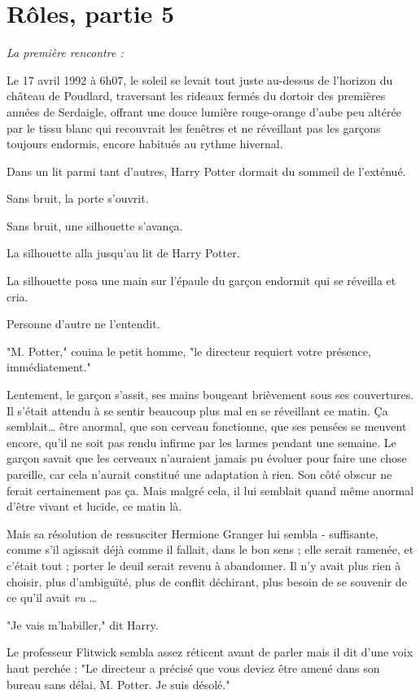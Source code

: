 
\chapter{Rôles, partie 5}

\emph{La première rencontre :} 

Le 17 avril 1992 à 6h07, le soleil se levait tout juste au-dessus de l'horizon du château de Poudlard, traversant les rideaux fermés du dortoir des premières années de Serdaigle, offrant une douce lumière rouge-orange d'aube peu altérée par le tissu blanc qui recouvrait les fenêtres et ne réveillant pas les garçons toujours endormis, encore habitués au rythme hivernal.

Dans un lit parmi tant d'autres, Harry Potter dormait du sommeil de l'exténué.

Sans bruit, la porte s'ouvrit.

Sans bruit, une silhouette s'avança.

La silhouette alla jusqu'au lit de Harry Potter.

La silhouette posa une main sur l'épaule du garçon endormit qui se réveilla et cria.

Personne d'autre ne l'entendit.

"M. Potter," couina le petit homme, "le directeur requiert votre présence, immédiatement."

Lentement, le garçon s'assit, ses mains bougeant brièvement sous ses couvertures. Il s'était attendu à se sentir beaucoup plus mal en se réveillant ce matin. Ça semblait… être anormal, que son cerveau fonctionne, que ses pensées se meuvent encore, qu'il ne soit pas rendu infirme par les larmes pendant une semaine. Le garçon savait que les cerveaux n'auraient jamais pu évoluer pour faire une chose pareille, car cela n'aurait constitué une adaptation à rien. Son côté obscur ne ferait certainement pas ça. Mais malgré cela, il lui semblait quand même anormal d'être vivant et lucide, ce matin là.

Mais sa résolution de ressusciter Hermione Granger lui sembla - suffisante, comme s'il agissait déjà comme il fallait, dans le bon sens ; elle serait ramenée, et c'était tout ; porter le deuil serait revenu à abandonner. Il n'y avait plus rien à choisir, plus d'ambiguïté, plus de conflit déchirant, plus besoin de se souvenir de ce qu'il avait \emph{vu} …

"Je vais m'habiller," dit Harry.

Le professeur Flitwick sembla assez réticent avant de parler mais il dit d'une voix haut perchée : "Le directeur a précisé que vous deviez être amené dans son bureau sans délai, M. Potter. Je suis désolé."

